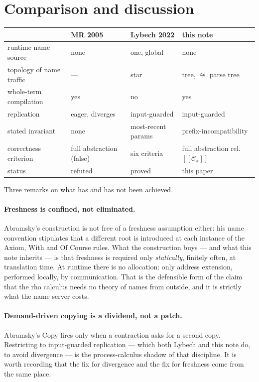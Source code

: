 \documentclass[11pt]{article}
\theoremstyle{definition}
\theoremstyle{plain}
\theoremstyle{remark}
\newcommand{\enc}[1]{[\![#1]\!]}
\newcommand{\Ctx}{\mathscr{C}}
\begin{document}
\section{Comparison and discussion}\label{sec:discussion}

\begin{center}
\begin{tabular}{@{}p{}p{}p{}p{}@{}}
\toprule
 & MR 2005 & Lybech 2022 & this note \\
\midrule
runtime name source & none & one, global & none \\
topology of name traffic & --- & star & tree, $\cong$ parse tree \\
whole-term compilation & yes & no & yes \\
replication & eager, diverges & input-guarded & input-guarded \\
stated invariant & none & most-recent params & prefix-incompatibility \\
correctness criterion & full abstraction (false) & six criteria & full abstraction rel.\ $\enc{\Ctx_\pi}$ \\
status & refuted & proved & this paper \\
\bottomrule
\end{tabular}
\end{center}

Three remarks on what has and has not been achieved.

\paragraph{Freshness is confined, not eliminated.}
Abramsky's construction is not free of a freshness assumption either: his
name convention stipulates that a different root is introduced at each
instance of the Axiom, With and Of Course rules. What the construction
buys --- and what this note inherits --- is that freshness is required
only \emph{statically}, finitely often, at translation time. At runtime
there is no allocation: only address extension, performed locally, by
communication. That is the defensible form of the claim that the rho
calculus needs no theory of names from outside, and it is strictly what
the name server costs.

\paragraph{Demand-driven copying is a dividend, not a patch.}
Abramsky's Copy fires only when a contraction asks for a second copy.
Restricting to input-guarded replication --- which both Lybech and this
note do, to avoid divergence --- is the process-calculus shadow of that
discipline. It is worth recording that the fix for divergence and the fix
for freshness come from the same place.
\end{document}
